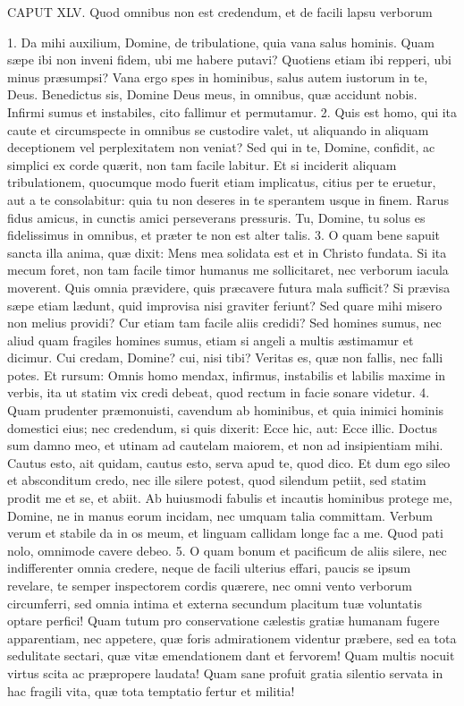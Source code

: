 \documentclass[twoside]{article}
\begin{document}
CAPUT XLV.
Quod omnibus non est credendum, et de facili lapsu verborum

1. Da mihi auxilium, Domine, de tribulatione, quia vana salus hominis. Quam sæpe ibi non inveni fidem, ubi me habere putavi? Quotiens etiam ibi repperi, ubi minus præsumpsi? Vana ergo spes in hominibus, salus autem iustorum in te, Deus. Benedictus sis, Domine Deus meus, in omnibus, quæ accidunt nobis. Infirmi sumus et instabiles, cito fallimur et permutamur.
2. Quis est homo, qui ita caute et circumspecte in omnibus se custodire valet, ut aliquando in aliquam deceptionem vel perplexitatem non veniat? Sed qui in te, Domine, confidit, ac simplici ex corde quærit, non tam facile labitur. Et si inciderit aliquam tribulationem, quocumque modo fuerit etiam implicatus, citius per te eruetur, aut a te consolabitur: quia tu non deseres in te sperantem usque in finem. Rarus fidus amicus, in cunctis amici perseverans pressuris. Tu, Domine, tu solus es fidelissimus in omnibus, et præter te non est alter talis.
3. O quam bene sapuit sancta illa anima, quæ dixit: Mens mea solidata est et in Christo fundata. Si ita mecum foret, non tam facile timor humanus me sollicitaret, nec verborum iacula moverent. Quis omnia prævidere, quis præcavere futura mala sufficit? Si prævisa sæpe etiam lædunt, quid improvisa nisi graviter feriunt? Sed quare mihi misero non melius providi? Cur etiam tam facile aliis credidi? Sed homines sumus, nec aliud quam fragiles homines sumus, etiam si angeli a multis æstimamur et dicimur. Cui credam, Domine? cui, nisi tibi? Veritas es, quæ non fallis, nec falli potes. Et rursum: Omnis homo mendax, infirmus, instabilis et labilis maxime in verbis, ita ut statim vix credi debeat, quod rectum in facie sonare videtur.
4. Quam prudenter præmonuisti, cavendum ab hominibus, et quia inimici hominis domestici eius; nec credendum, si quis dixerit: Ecce hic, aut: Ecce illic. Doctus sum damno meo, et utinam ad cautelam maiorem, et non ad insipientiam mihi. Cautus esto, ait quidam, cautus esto, serva apud te, quod dico. Et dum ego sileo et absconditum credo, nec ille silere potest, quod silendum petiit, sed statim prodit me et se, et abiit. Ab huiusmodi fabulis et incautis hominibus protege me, Domine, ne in manus eorum incidam, nec umquam talia committam. Verbum verum et stabile da in os meum, et linguam callidam longe fac a me. Quod pati nolo, omnimode cavere debeo.
5. O quam bonum et pacificum de aliis silere, nec indifferenter omnia credere, neque de facili ulterius effari, paucis se ipsum revelare, te semper inspectorem cordis quærere, nec omni vento verborum circumferri, sed omnia intima et externa secundum placitum tuæ voluntatis optare perfici! Quam tutum pro conservatione cælestis gratiæ humanam fugere apparentiam, nec appetere, quæ foris admirationem videntur præbere, sed ea tota sedulitate sectari, quæ vitæ emendationem dant et fervorem! Quam multis nocuit virtus scita ac præpropere laudata! Quam sane profuit gratia silentio servata in hac fragili vita, quæ tota temptatio fertur et militia!
\end{document}
